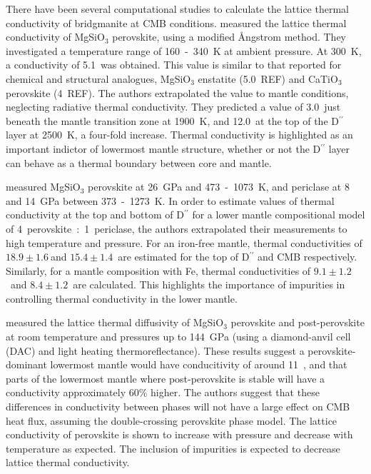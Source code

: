 There have been several computational studies to calculate the lattice thermal conductivity of bridgmanite at CMB conditions. \citet{Osako1991} measured the lattice thermal conductivity of MgSiO$_3$ perovskite, using a modified \AA ngstrom method. They investigated a temperature range of 160~-~340~K at ambient pressure. At 300~K, a conductivity of 5.1~\wmk was obtained. This value is similar to that reported for chemical and structural analogues, MgSiO$_3$ enstatite (5.0~\wmk REF) and CaTiO$_{3}$ perovskite (4~\wmk REF). The authors extrapolated the value to mantle conditions, neglecting radiative thermal conductivity. They predicted a value of 3.0~\wmk just beneath the mantle transition zone at 1900~K, and 12.0~\wmk at the top of the D$^{\prime \prime}$ layer at 2500~K, a four-fold increase. Thermal conductivity is highlighted as an important indictor of lowermost mantle structure, whether or not the D$^{\prime \prime}$ layer can behave as a thermal boundary between core and mantle.

\par \citet{Manthilake2011} measured MgSiO$_3$ perovskite at 26~GPa and 473~-~1073~K, and periclase at 8 and 14~GPa between 373~-~1273~K. In order to estimate values of thermal conductivity at the top and bottom of D$^{\prime \prime}$ for a lower mantle compositional model of 4~perovskite~:~1~periclase, the authors extrapolated their measurements to high temperature and pressure. For an iron-free mantle, thermal conductivities of $18.9\pm1.6~$\wmk and $15.4\pm1.4$~\wmk are estimated for the top of D$^{\prime \prime}$ and CMB respectively. Similarly, for a mantle composition with Fe, thermal conductivities of $9.1\pm1.2$~\wmk and $8.4\pm1.2$~\wmk are calculated. This highlights the importance of impurities in controlling thermal conductivity in the lower mantle.

\par \citet{Ohta2012} measured the lattice thermal diffusivity of MgSiO$_3$ perovskite and post-perovskite at room temperature and pressures up to 144~GPa (using a diamond-anvil cell (DAC) and light heating thermoreflectance). These results suggest a perovskite-dominant lowermost mantle would have conducitivity of around 11~\wmk, and that parts of the lowermost mantle where post-perovskite is stable will have a conductivity approximately 60\% higher. The authors suggest that these differences in conductivity between phases will not have a large effect on CMB heat flux, assuming the double-crossing perovskite phase model. The lattice conductivity of \mgsios perovskite is shown to increase with pressure and decrease with temperature as expected. The inclusion of impurities is expected to decrease lattice thermal conductivity.

